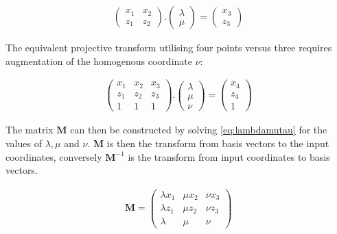 \begin{align}
\begin{pmatrix}
x_1 & x_2 \\
z_1 & z_2
\end{pmatrix}
.
\begin{pmatrix}
\lambda  \\
\mu
\end{pmatrix}
= \begin{pmatrix}
x_3  \\
z_3
\end{pmatrix}
\end{align}

The equivalent projective transform utilising four points versus three requires augmentation of the homogenous coordinate $\nu$:

\begin{align}
\begin{pmatrix}
x_1 & x_2 & x_3 \\
z_1 & z_2 & z_3 \\
1 & 1 & 1
\end{pmatrix}
.
\begin{pmatrix}
\lambda  \\
\mu \\
\nu
\end{pmatrix}
= \begin{pmatrix}
x_4  \\
z_4 \\
1
\end{pmatrix} \label{eq:lambdamutau}
\end{align}

The matrix $\textbf{M}$ can then be constructed by solving \eqref{eq:lambdamutau} for the values of $\lambda, \mu $ and $\nu$.
$\textbf{M}$ is then the transform from basis vectors to the input coordinates, conversely ${\textbf{M}}^{-1}$ is the transform from input coordinates to basis vectors.

\begin{align}
\textbf{M} =
\begin{pmatrix}
\lambda x_1 & \mu x_2 & \nu x_3 \\
\lambda z_1 & \mu z_2 & \nu z_3 \\
\lambda & \mu & \nu
\end{pmatrix}
\end{align}


